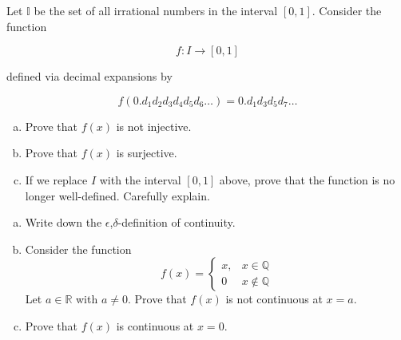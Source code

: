 \documentclass[11pt]{exam}
\theoremstyle{definition}
\begin{document}
\begin{questions}
\newpage
\question[10]\mbox{}

Let $\mathbb{I}$ be the set of all irrational numbers in the interval $[0,1]$.
Consider the function

$$f: I\rightarrow [0,1]$$

defined via decimal expansions by

$$f(0.d_1d_2d_3d_4d_5d_6\dots) = 0.d_1d_3d_5d_7\dots$$

\begin{enumerate}[(a)]
\item Prove that $f(x)$ is not injective.
\vspace{2.5in}
\item Prove that $f(x)$ is surjective.
\vspace{2.5in}
\item If we replace $I$ with the interval $[0,1]$ above, prove that the function is no longer well-defined.  Carefully explain.
\end{enumerate}

\newpage
\question[10]\mbox{}


\begin{enumerate}[(a)]
\item Write down the $\epsilon$,$\delta$-definition of continuity.
\vspace{1in}
\item Consider the function
$$f(x) = \left\lbrace\begin{array}{cc}x, & x\in \mathbb{Q}\\0 & x\notin\mathbb{Q}\end{array}\right.$$
Let $a\in\mathbb{R}$ with $a\neq 0$.  Prove that $f(x)$ is not continuous at $x=a$.
\vspace{3in}
\item Prove that $f(x)$ is continuous at $x=0$.
\end{enumerate}

\end{questions}
\end{document}
